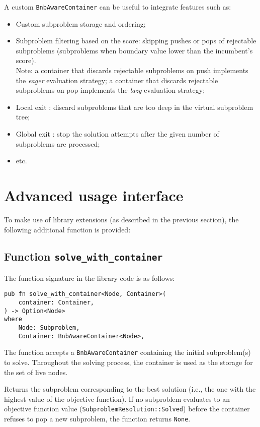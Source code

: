 A custom \texttt{BnbAwareContainer} can be useful to integrate features such as:

\begin{itemize}
 \item Custom subproblem storage and ordering;
 \item Subproblem filtering based on the score: skipping pushes or pops of rejectable
    subproblems (subproblems when boundary value lower than the incumbent's score). \\
    Note: a container that discards rejectable subproblems on push implements the \emph{eager}
    evaluation strategy; a container that discards rejectable subproblems on pop implements
    the \emph{lazy} evaluation strategy;
 \item Local exit \cite{narkawicz2013formalnasa}: discard subproblems that are too deep in
    the virtual subproblem tree;
 \item Global exit \cite{narkawicz2013formalnasa}: stop the solution attempts after the given
    number of subproblems are processed;
 \item etc.
\end{itemize}

\section{Advanced usage interface}

To make use of library extensions (as described in the previous section), the following
additional function is provided:

\subsection{Function \texttt{solve\_with\_container}}

The function signature in the library code is as follows:

\begin{lstlisting}[caption=Function \texttt{solve\_with\_container}]
pub fn solve_with_container<Node, Container>(
    container: Container,
) -> Option<Node>
where
    Node: Subproblem,
    Container: BnbAwareContainer<Node>,
\end{lstlisting}

The function accepts a \texttt{BnbAwareContainer} containing the initial subproblem(s) to
solve. Throughout the solving process, the container is used as the storage for the set of
live nodes.

Returns the subproblem corresponding to the best solution (i.e., the one with the
highest value of the objective function). If no subproblem evaluates to an objective
function value (\texttt{SubproblemResolution::Solved}) before the container refuses to pop
a new subproblem, the function returns \texttt{None}.
